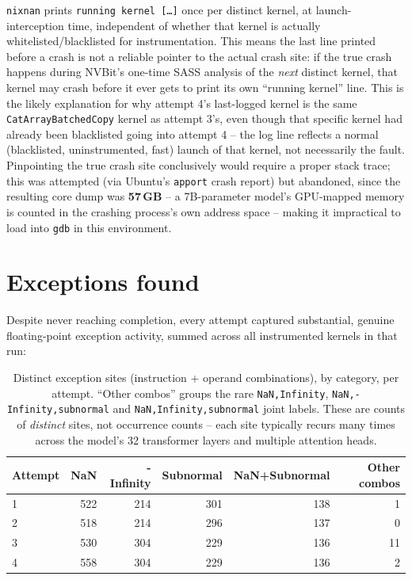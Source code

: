 \documentclass[11pt]{article}
\begin{document}
\texttt{nixnan} prints \texttt{running kernel [\ldots]} once per distinct
kernel, at launch-interception time, independent of whether that kernel
is actually whitelisted/blacklisted for instrumentation. This means the
last line printed before a crash is not a reliable pointer to the actual
crash site: if the true crash happens during NVBit's one-time SASS
analysis of the \emph{next} distinct kernel, that kernel may crash before
it ever gets to print its own ``running kernel'' line. This is the
likely explanation for why attempt 4's last-logged kernel is the same
\texttt{CatArrayBatchedCopy} kernel as attempt 3's, even though that
specific kernel had already been blacklisted going into attempt 4 --
the log line reflects a normal (blacklisted, uninstrumented, fast) launch
of that kernel, not necessarily the fault. Pinpointing the true crash
site conclusively would require a proper stack trace; this was attempted
(via Ubuntu's \texttt{apport} crash report) but abandoned, since the
resulting core dump was \textbf{57\,GB} -- a 7B-parameter model's
GPU-mapped memory is counted in the crashing process's own address
space -- making it impractical to load into \texttt{gdb} in this
environment.

\section{Exceptions found}
\label{sec:exceptions}

Despite never reaching completion, every attempt captured substantial,
genuine floating-point exception activity, summed across all instrumented
kernels in that run:

\begin{table}[h]
\centering
\begin{tabular}{lrrrrr}
\toprule
\textbf{Attempt} & \textbf{NaN} & \textbf{-Infinity} & \textbf{Subnormal} & \textbf{NaN+Subnormal} & \textbf{Other combos} \\
\midrule
1 & 522 & 214 & 301 & 138 & 1 \\
2 & 518 & 214 & 296 & 137 & 0 \\
3 & 530 & 304 & 229 & 136 & 11 \\
4 & 558 & 304 & 229 & 136 & 2 \\
\bottomrule
\end{tabular}
\caption{Distinct exception sites (instruction + operand combinations),
by category, per attempt. ``Other combos'' groups the rare
\texttt{NaN,Infinity}, \texttt{NaN,-Infinity,subnormal} and
\texttt{NaN,Infinity,subnormal} joint labels. These are counts of
\emph{distinct} sites, not occurrence counts -- each site typically
recurs many times across the model's 32 transformer layers and multiple
attention heads.}
\label{tab:exceptions}
\end{table}
\end{document}
